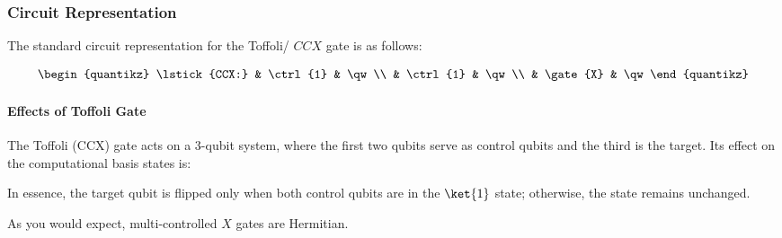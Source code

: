 \subsubsection*{Circuit Representation}

The standard circuit representation for the Toffoli/ $CCX$ gate is as follows:

\begin{align*}
  \begin{quantikz}
    \lstick{CCX:} & \ctrl{1} & \qw \\
                  & \ctrl{1} & \qw \\
                  & \gate{X} & \qw
  \end{quantikz}
\end{align*}

\paragraph{Effects of Toffoli Gate}\label{par:Effects of Toffoli Gate}

The Toffoli (CCX) gate acts on a 3-qubit system, where the first two qubits
serve as control qubits and the third is the target. Its effect on the
computational basis states is:

\nt{
  \[
    \begin{aligned}
      \text{Toffoli}\,\ket{000} &= \ket{000}  \quad & \text{Toffoli}\,\ket{100} &= \ket{100} \\
      \text{Toffoli}\,\ket{001} &= \ket{001} \quad &       \text{Toffoli}\,\ket{101} &= \ket{101} \\
      \text{Toffoli}\,\ket{010} &= \ket{010} \quad &       \text{Toffoli}\,\ket{110} &= \ket{111} \\
      \text{Toffoli}\,\ket{011} &= \ket{011}  \quad &       \text{Toffoli}\,\ket{111} &= \ket{110}
    \end{aligned}
  \]
}

In essence, the target qubit is flipped only when both control qubits are in
the \(\ket{1}\) state; otherwise, the state remains unchanged.


As you would expect, multi-controlled $X$ gates are Hermitian.

